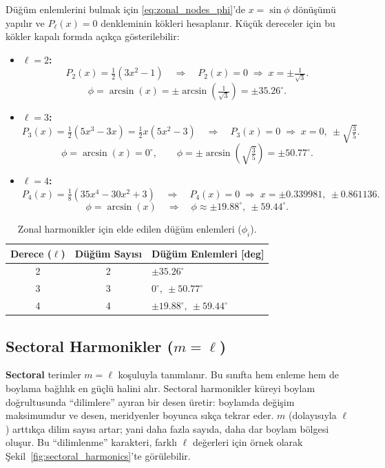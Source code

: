\bigskip
\noindent
Düğüm enlemlerini bulmak için \eqref{eq:zonal_nodes_phi}’de $x=\sin\phi$ dönüşümü yapılır ve
$P_\ell(x)=0$ denkleminin kökleri hesaplanır. Küçük dereceler için bu kökler kapalı formda
açıkça gösterilebilir:

\begin{itemize}
\item \textbf{$\ell=2$:}
\[
P_2(x)=\tfrac{1}{2}(3x^2-1)
\quad\Rightarrow\quad
P_2(x)=0 \;\Rightarrow\; x=\pm \tfrac{1}{\sqrt{3}}.
\]
\[
\phi=\arcsin(x)=\pm \arcsin\!\left(\tfrac{1}{\sqrt{3}}\right)=\pm 35.26^\circ.
\]

\item \textbf{$\ell=3$:}
\[
P_3(x)=\tfrac{1}{2}(5x^3-3x)=\tfrac{1}{2}x(5x^2-3)
\quad\Rightarrow\quad
P_3(x)=0 \;\Rightarrow\; x=0,\ \pm\sqrt{\tfrac{3}{5}}.
\]
\[
\phi=\arcsin(x)=0^\circ,\qquad
\phi=\pm \arcsin\!\left(\sqrt{\tfrac{3}{5}}\right)=\pm 50.77^\circ.
\]

\item \textbf{$\ell=4$:}
\[
P_4(x)=\tfrac{1}{8}(35x^4-30x^2+3)
\quad\Rightarrow\quad
P_4(x)=0 \;\Rightarrow\; x=\pm 0.339981,\ \pm 0.861136.
\]
\[
\phi=\arcsin(x)
\quad\Rightarrow\quad
\phi\approx \pm 19.88^\circ,\ \pm 59.44^\circ.
\]

\end{itemize}

\begin{table}[h]
\centering
\caption{Zonal harmonikler için elde edilen düğüm enlemleri ($\phi_i$).}
\label{tab:zonal_nodes}
\renewcommand{\arraystretch}{1.25}
\begin{tabular}{@{} c c l @{}} 
\toprule
\textbf{Derece ($\ell$)} & \textbf{Düğüm Sayısı} & \textbf{Düğüm Enlemleri [deg]} \\
\midrule
2 & 2 & $\pm 35.26^\circ$ \\
3 & 3 & $0^\circ,\ \pm 50.77^\circ$ \\
4 & 4 & $\pm 19.88^\circ,\ \pm 59.44^\circ$ \\
\bottomrule
\end{tabular}
\end{table}



\subsection{Sectoral Harmonikler ($m=\ell$)}
\label{subsec:sectoral}

\textbf{Sectoral} terimler $m=\ell$ koşuluyla tanımlanır.
Bu sınıfta hem enleme hem de boylama bağlılık en güçlü halini alır. Sectoral harmonikler küreyi boylam doğrultusunda ``dilimlere'' ayıran bir desen üretir: boylamda değişim maksimumdur ve desen, meridyenler boyunca sıkça tekrar eder.
$m$ (dolayısıyla $\ell$) arttıkça dilim sayısı artar; yani daha fazla sayıda, daha dar boylam bölgesi oluşur. Bu ``dilimlenme'' karakteri, farklı $\ell$ değerleri için örnek olarak
Şekil~\ref{fig:sectoral_harmonics}'te görülebilir.

